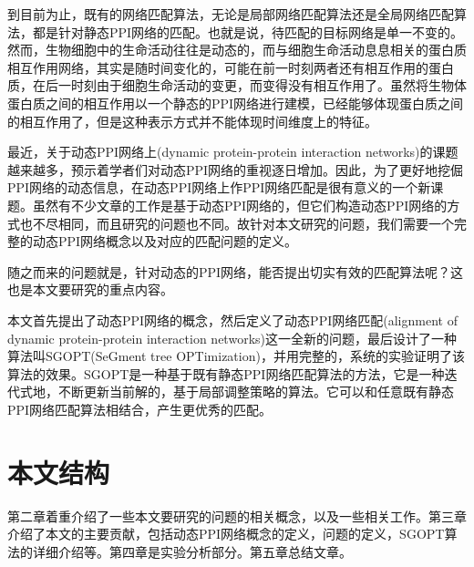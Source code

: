 到目前为止，既有的网络匹配算法，无论是局部网络匹配算法还是全局网络匹配算法，都是针对静态PPI网络的匹配。也就是说，待匹配的目标网络是单一不变的。然而，生物细胞中的生命活动往往是动态的，而与细胞生命活动息息相关的蛋白质相互作用网络，其实是随时间变化的，可能在前一时刻两者还有相互作用的蛋白质，在后一时刻由于细胞生命活动的变更，而变得没有相互作用了。虽然将生物体蛋白质之间的相互作用以一个静态的PPI网络进行建模，已经能够体现蛋白质之间的相互作用了，但是这种表示方式并不能体现时间维度上的特征。

最近，关于动态PPI网络上(dynamic protein-protein interaction networks)的课题越来越多，预示着学者们对动态PPI网络的重视逐日增加。因此，为了更好地挖倔PPI网络的动态信息，在动态PPI网络上作PPI网络匹配是很有意义的一个新课题。虽然有不少文章的工作是基于动态PPI网络的\cite{lin2010dynamic,chen2014identifying,wang2013construction}，但它们构造动态PPI网络的方式也不尽相同，而且研究的问题也不同。故针对本文研究的问题，我们需要一个完整的动态PPI网络概念以及对应的匹配问题的定义。

随之而来的问题就是，针对动态的PPI网络，能否提出切实有效的匹配算法呢？这也是本文要研究的重点内容。

本文首先提出了动态PPI网络的概念，然后定义了动态PPI网络匹配(alignment of dynamic protein-protein interaction networks)这一全新的问题，最后设计了一种算法叫SGOPT(SeGment tree OPTimization)，并用完整的，系统的实验证明了该算法的效果。SGOPT是一种基于既有静态PPI网络匹配算法的方法，它是一种迭代式地，不断更新当前解的，基于局部调整策略的算法。它可以和任意既有静态PPI网络匹配算法相结合，产生更优秀的匹配。
\section{本文结构}

第二章着重介绍了一些本文要研究的问题的相关概念，以及一些相关工作。第三章介绍了本文的主要贡献，包括动态PPI网络概念的定义，问题的定义，SGOPT算法的详细介绍等。第四章是实验分析部分。第五章总结文章。
